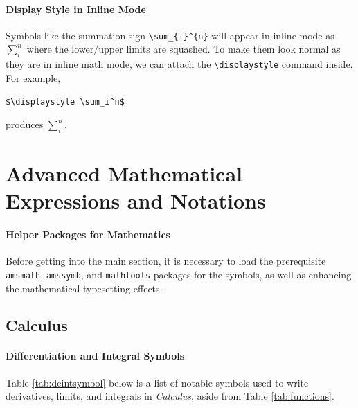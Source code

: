 \paragraph{Display Style in Inline Mode}
Symbols like the summation sign \texttt{\textbackslash sum\_\{i\}\^{}\{n\}} will appear in inline mode as $\sum_i^n$ where the lower/upper limits are squashed. To make them look normal as they are in inline math mode, we can attach the \texttt{\textbackslash displaystyle} command inside. For example, 
\begin{lstlisting}
$\displaystyle \sum_i^n$    
\end{lstlisting}
produces $\displaystyle \sum_i^n$.

\section{Advanced Mathematical Expressions and Notations}

\paragraph{Helper Packages for Mathematics}
Before getting into the main section, it is necessary to load the prerequisite \verb|amsmath|, \verb|amssymb|, and \verb|mathtools| packages for the symbols, as well as enhancing the mathematical typesetting effects.

\subsection{Calculus}

\paragraph{Differentiation and Integral Symbols}
Table \ref{tab:deintsymbol} below is a list of notable symbols used to write derivatives, limits, and integrals in \textit{Calculus}, aside from Table \ref{tab:functions}.

